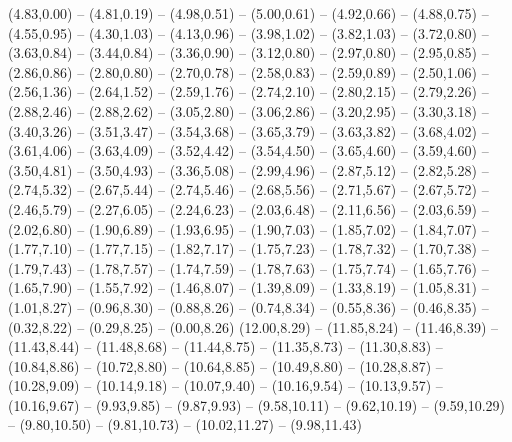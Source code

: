 \expandafter\def\csname geo:fluss:Rhein\endcsname{
  (4.83,0.00) -- (4.81,0.19) -- (4.98,0.51) -- (5.00,0.61) -- (4.92,0.66) -- (4.88,0.75) -- (4.55,0.95) -- (4.30,1.03) -- (4.13,0.96) -- (3.98,1.02) -- (3.82,1.03) -- (3.72,0.80) -- (3.63,0.84) -- (3.44,0.84) -- (3.36,0.90) -- (3.12,0.80) -- (2.97,0.80) -- (2.95,0.85) -- (2.86,0.86) -- (2.80,0.80) -- (2.70,0.78) -- (2.58,0.83) -- (2.59,0.89) -- (2.50,1.06) -- (2.56,1.36) -- (2.64,1.52) -- (2.59,1.76) -- (2.74,2.10) -- (2.80,2.15) -- (2.79,2.26) -- (2.88,2.46) -- (2.88,2.62) -- (3.05,2.80) -- (3.06,2.86) -- (3.20,2.95) -- (3.30,3.18) -- (3.40,3.26) -- (3.51,3.47) -- (3.54,3.68) -- (3.65,3.79) -- (3.63,3.82) -- (3.68,4.02) -- (3.61,4.06) -- (3.63,4.09) -- (3.52,4.42) -- (3.54,4.50) -- (3.65,4.60) -- (3.59,4.60) -- (3.50,4.81) -- (3.50,4.93) -- (3.36,5.08) -- (2.99,4.96) -- (2.87,5.12) -- (2.82,5.28) -- (2.74,5.32) -- (2.67,5.44) -- (2.74,5.46) -- (2.68,5.56) -- (2.71,5.67) -- (2.67,5.72) -- (2.46,5.79) -- (2.27,6.05) -- (2.24,6.23) -- (2.03,6.48) -- (2.11,6.56) -- (2.03,6.59) -- (2.02,6.80) -- (1.90,6.89) -- (1.93,6.95) -- (1.90,7.03) -- (1.85,7.02) -- (1.84,7.07) -- (1.77,7.10) -- (1.77,7.15) -- (1.82,7.17) -- (1.75,7.23) -- (1.78,7.32) -- (1.70,7.38) -- (1.79,7.43) -- (1.78,7.57) -- (1.74,7.59) -- (1.78,7.63) -- (1.75,7.74) -- (1.65,7.76) -- (1.65,7.90) -- (1.55,7.92) -- (1.46,8.07) -- (1.39,8.09) -- (1.33,8.19) -- (1.05,8.31) -- (1.01,8.27) -- (0.96,8.30) -- (0.88,8.26) -- (0.74,8.34) -- (0.55,8.36) -- (0.46,8.35) -- (0.32,8.22) -- (0.29,8.25) -- (0.00,8.26)}
\expandafter\def\csname geo:fluss:Oder\endcsname{
  (12.00,8.29) -- (11.85,8.24) -- (11.46,8.39) -- (11.43,8.44) -- (11.48,8.68) -- (11.44,8.75) -- (11.35,8.73) -- (11.30,8.83) -- (10.84,8.86) -- (10.72,8.80) -- (10.64,8.85) -- (10.49,8.80) -- (10.28,8.87) -- (10.28,9.09) -- (10.14,9.18) -- (10.07,9.40) -- (10.16,9.54) -- (10.13,9.57) -- (10.16,9.67) -- (9.93,9.85) -- (9.87,9.93) -- (9.58,10.11) -- (9.62,10.19) -- (9.59,10.29) -- (9.80,10.50) -- (9.81,10.73) -- (10.02,11.27) -- (9.98,11.43)}

